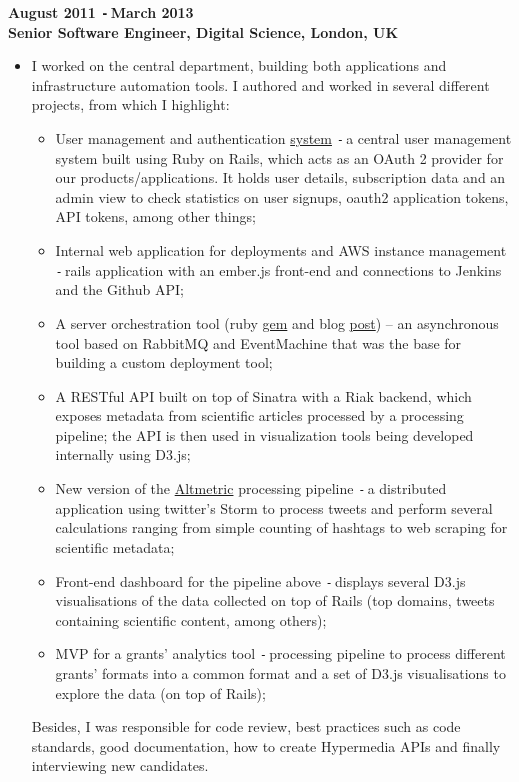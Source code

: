 \documentclass{res}
\def\Minus{\texttt{-}\,}
\begin{document}
\begin{resume}
  {\bf August 2011 \Minus March 2013}\\
  {\bf Senior Software Engineer, Digital Science, London, UK}
    \begin{itemize}
      \item[] I worked on the central department, building both
      applications and infrastructure automation tools. I authored and worked
      in several different projects, from which I highlight:
        \begin{itemize}
        \item User management and authentication \href{https://auth.digital-science.com/}{system} \Minus a central user management
        system built using Ruby on Rails, which acts as an OAuth 2 provider for
        our products/applications. It holds user details, subscription data and
        an admin view to check statistics on user signups, oauth2 application
        tokens, API tokens, among other things;
        \item Internal web application for deployments and AWS instance management \Minus rails application with an ember.js front-end and connections to Jenkins and the Github API;
        \item A server orchestration tool (ruby \href{https://rubygems.org/gems/baton}{gem} and blog \href{http://www.digital-science.com/blog/posts/presenting-baton}{post}) – an asynchronous tool based on RabbitMQ and EventMachine that was the base for building a custom deployment tool;
        \item A RESTful API built on top of Sinatra with a Riak backend, which exposes metadata from scientific articles processed by a processing pipeline; the API is then used in visualization tools being developed internally using D3.js;
        \item New version of the \href{http://altmetric.com}{Altmetric} processing pipeline \Minus a distributed application using twitter’s Storm to process tweets and perform several calculations ranging from simple counting of hashtags to web scraping for scientific metadata;
        \item Front-end dashboard for the pipeline above \Minus displays several D3.js visualisations of the data collected on top of Rails (top domains, tweets containing scientific content, among others);
        \item MVP for a grants’ analytics tool \Minus processing pipeline to process different grants’ formats into a common format and a set of D3.js visualisations to explore the data (on top of Rails);
        \end{itemize}
      Besides, I was responsible for code review, best practices such as code standards, good documentation, how to create Hypermedia APIs and finally interviewing new candidates.


\end{itemize}
\end{resume}
\end{document}
